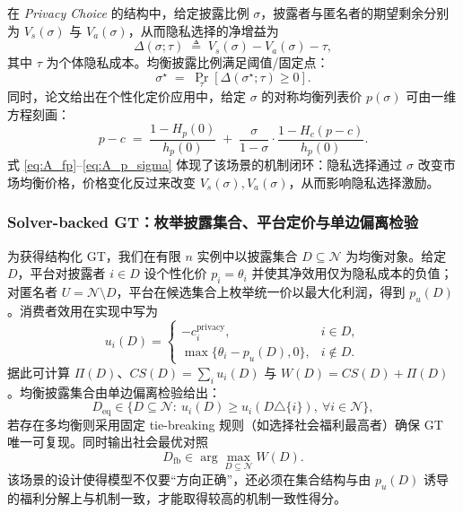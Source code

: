 在 \emph{Privacy Choice} 的结构中，给定披露比例 $\sigma$，披露者与匿名者的期望剩余分别为 $V_s(\sigma)$ 与 $V_a(\sigma)$，从而隐私选择的净增益为
\begin{equation}
\Delta(\sigma;\tau)\;\triangleq\; V_s(\sigma)-V_a(\sigma)-\tau,
\label{eq:A_delta}
\end{equation}
其中 $\tau$ 为个体隐私成本。均衡披露比例满足阈值/固定点：
\begin{equation}
\sigma^\star \;=\; \Pr_{\tau}\!\left[\Delta(\sigma^\star;\tau)\ge 0\right].
\label{eq:A_fp}
\end{equation}
同时，论文给出在个性化定价应用中，给定 $\sigma$ 的对称均衡列表价 $p(\sigma)$ 可由一维方程刻画：
\begin{equation}
p-c \;=\; \frac{1-H_p(0)}{h_p(0)} \;+\; \frac{\sigma}{1-\sigma}\cdot \frac{1-H_c(p-c)}{h_p(0)}.
\label{eq:A_p_sigma}
\end{equation}
式 \eqref{eq:A_fp}--\eqref{eq:A_p_sigma} 体现了该场景的机制闭环：隐私选择通过 $\sigma$ 改变市场均衡价格，价格变化反过来改变 $V_s(\sigma),V_a(\sigma)$，从而影响隐私选择激励。

\subsubsection{Solver-backed GT：枚举披露集合、平台定价与单边偏离检验}
\label{subsubsec:A_solver}

为获得结构化 GT，我们在有限 $n$ 实例中以披露集合 $D\subseteq\mathcal{N}$ 为均衡对象。给定 $D$，平台对披露者 $i\in D$ 设个性化价 $p_i=\theta_i$ 并使其净效用仅为隐私成本的负值；对匿名者 $U=\mathcal{N}\setminus D$，平台在候选集合上枚举统一价以最大化利润，得到 $p_u(D)$。消费者效用在实现中写为
\begin{equation}
u_i(D)=
\begin{cases}
 -c_i^{\text{privacy}}, & i\in D, \\[2pt]
 \max\{\theta_i - p_u(D), 0\}, & i\notin D .
\end{cases}
\label{eq:A_utility_impl}
\end{equation}
据此可计算 $\Pi(D)$、$CS(D)=\sum_i u_i(D)$ 与 $W(D)=CS(D)+\Pi(D)$。均衡披露集合由单边偏离检验给出：
\begin{equation}
D_{\text{eq}} \in \Big\{D\subseteq\mathcal{N}:\ 
u_i(D)\ge u_i(D\triangle \{i\}),\ \forall i\in\mathcal{N}\Big\},
\label{eq:A_nash_check}
\end{equation}
若存在多均衡则采用固定 tie-breaking 规则（如选择社会福利最高者）确保 GT 唯一可复现。同时输出社会最优对照
\begin{equation}
D_{\text{fb}} \in \arg\max_{D\subseteq\mathcal{N}} W(D).
\label{eq:A_firstbest}
\end{equation}
该场景的设计使得模型不仅要“方向正确”，还必须在集合结构与由 $p_u(D)$ 诱导的福利分解上与机制一致，才能取得较高的机制一致性得分。

